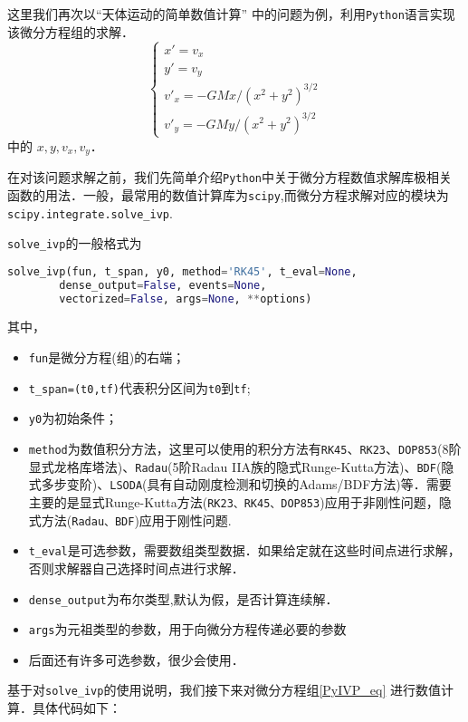 这里我们再次以“天体运动的简单数值计算” 中的问题为例，利用\verb |Python|语言实现该微分方程组的求解．
\begin{equation}\label{PyIVP_eq}
\begin{cases}
x' = v_x\\
y' = v_y\\
v'_x = -GMx/(x^2 + y^2)^{3/2}\\
v'_y = -GMy/(x^2 + y^2)^{3/2}
\end{cases}
\end{equation}
中的 $x, y, v_x, v_y$．

在对该问题求解之前，我们先简单介绍\verb|Python|中关于微分方程数值求解库极相关函数的用法．一般，最常用的数值计算库为\verb|scipy|,而微分方程求解对应的模块为\verb|scipy.integrate.solve_ivp|.

 \verb|solve_ivp|的一般格式为
 \begin{lstlisting}[language=python]
 solve_ivp(fun, t_span, y0, method='RK45', t_eval=None,
        dense_output=False, events=None, 
        vectorized=False, args=None, **options)
 \end{lstlisting}
 其中，
\begin{itemize}
\item \verb|fun|是微分方程(组)的右端；
\item  \verb|t_span=(t0,tf)|代表积分区间为\verb|t0|到\verb|tf|;
\item  \verb|y0|为初始条件；
\item \verb|method|为数值积分方法，这里可以使用的积分方法有\verb|RK45|、\verb|RK23|、\verb|DOP853|(8阶显式龙格库塔法)、\verb|Radau|(5阶Radau IIA族的隐式Runge-Kutta方法)、\verb|BDF|(隐式多步变阶)、\verb|LSODA|(具有自动刚度检测和切换的Adams/BDF方法)等．需要主要的是显式Runge-Kutta方法(\verb|RK23、RK45、DOP853|)应用于非刚性问题，隐式方法(\verb|Radau、BDF|)应用于刚性问题.
\item \verb|t_eval|是可选参数，需要数组类型数据．如果给定就在这些时间点进行求解，否则求解器自己选择时间点进行求解．
\item \verb|dense_output|为布尔类型,默认为假，是否计算连续解．
\item \verb|args|为元祖类型的参数，用于向微分方程传递必要的参数
\item 后面还有许多可选参数，很少会使用．
\end{itemize}


基于对\verb|solve_ivp|的使用说明，我们接下来对微分方程组\ref{PyIVP_eq} 进行数值计算．具体代码如下：
\begin{lstlisting}[language=python]

\end{lstlisting}